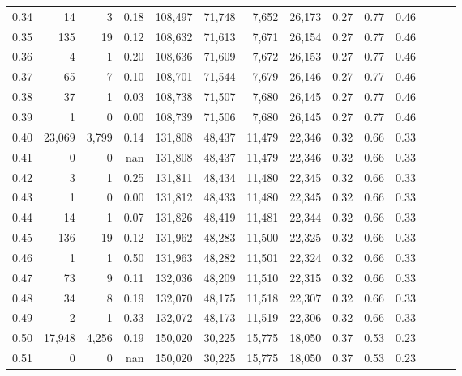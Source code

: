 \begin{tabular}{rrrrrrrrrrrrrr}
0.34 &      14 &      3 &  0.18 &  108,497 &   71,748 &   7,652 &  26,173 &  0.27 &  0.77 &      0.46 \\
0.35 &     135 &     19 &  0.12 &  108,632 &   71,613 &   7,671 &  26,154 &  0.27 &  0.77 &      0.46 \\
0.36 &       4 &      1 &  0.20 &  108,636 &   71,609 &   7,672 &  26,153 &  0.27 &  0.77 &      0.46 \\
0.37 &      65 &      7 &  0.10 &  108,701 &   71,544 &   7,679 &  26,146 &  0.27 &  0.77 &      0.46 \\
0.38 &      37 &      1 &  0.03 &  108,738 &   71,507 &   7,680 &  26,145 &  0.27 &  0.77 &      0.46 \\
0.39 &       1 &      0 &  0.00 &  108,739 &   71,506 &   7,680 &  26,145 &  0.27 &  0.77 &      0.46 \\
0.40 &  23,069 &  3,799 &  0.14 &  131,808 &   48,437 &  11,479 &  22,346 &  0.32 &  0.66 &      0.33 \\
0.41 &       0 &      0 &   nan &  131,808 &   48,437 &  11,479 &  22,346 &  0.32 &  0.66 &      0.33 \\
0.42 &       3 &      1 &  0.25 &  131,811 &   48,434 &  11,480 &  22,345 &  0.32 &  0.66 &      0.33 \\
0.43 &       1 &      0 &  0.00 &  131,812 &   48,433 &  11,480 &  22,345 &  0.32 &  0.66 &      0.33 \\
0.44 &      14 &      1 &  0.07 &  131,826 &   48,419 &  11,481 &  22,344 &  0.32 &  0.66 &      0.33 \\
0.45 &     136 &     19 &  0.12 &  131,962 &   48,283 &  11,500 &  22,325 &  0.32 &  0.66 &      0.33 \\
0.46 &       1 &      1 &  0.50 &  131,963 &   48,282 &  11,501 &  22,324 &  0.32 &  0.66 &      0.33 \\
0.47 &      73 &      9 &  0.11 &  132,036 &   48,209 &  11,510 &  22,315 &  0.32 &  0.66 &      0.33 \\
0.48 &      34 &      8 &  0.19 &  132,070 &   48,175 &  11,518 &  22,307 &  0.32 &  0.66 &      0.33 \\
0.49 &       2 &      1 &  0.33 &  132,072 &   48,173 &  11,519 &  22,306 &  0.32 &  0.66 &      0.33 \\
0.50 &  17,948 &  4,256 &  0.19 &  150,020 &   30,225 &  15,775 &  18,050 &  0.37 &  0.53 &      0.23 \\
0.51 &       0 &      0 &   nan &  150,020 &   30,225 &  15,775 &  18,050 &  0.37 &  0.53 &      0.23 \\

\end{tabular}
